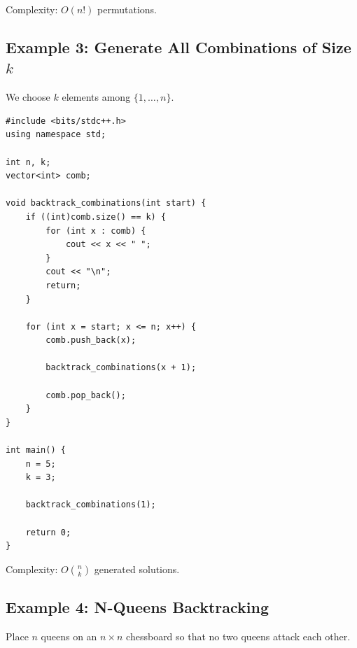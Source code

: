 \documentclass[11pt]{article}
\begin{document}
Complexity: $O(n!)$ permutations.

\subsection{Example 3: Generate All Combinations of Size $k$}

We choose $k$ elements among $\{1,\dots,n\}$.

\begin{lstlisting}
#include <bits/stdc++.h>
using namespace std;

int n, k;
vector<int> comb;

void backtrack_combinations(int start) {
    if ((int)comb.size() == k) {
        for (int x : comb) {
            cout << x << " ";
        }
        cout << "\n";
        return;
    }

    for (int x = start; x <= n; x++) {
        comb.push_back(x);

        backtrack_combinations(x + 1);

        comb.pop_back();
    }
}

int main() {
    n = 5;
    k = 3;

    backtrack_combinations(1);

    return 0;
}
\end{lstlisting}

Complexity: $O\binom{n}{k}$ generated solutions.

\subsection{Example 4: N-Queens Backtracking}

Place $n$ queens on an $n \times n$ chessboard so that no two queens attack
each other.
\end{document}
